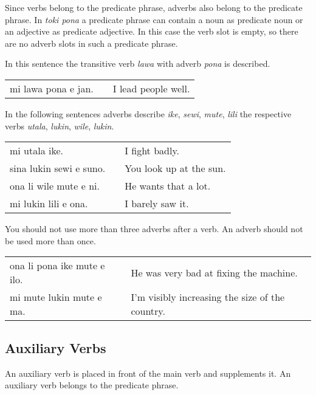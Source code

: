 Since verbs belong to the predicate phrase, adverbs also belong to the predicate phrase.
In \textit{toki pona} a predicate phrase can contain a noun as predicate noun or an adjective as predicate adjective.
In this case the verb slot is empty, so there are no adverb slots in such a predicate phrase.

In this sentence the transitive verb \textit{lawa} with adverb \textit{pona} is described.

\begin{supertabular}{p{5,5cm}|ll}
    mi lawa pona e jan. &  & I lead people well. \\
\end{supertabular}

In the following sentences adverbs describe \textit{ike}, \textit{sewi}, \textit{mute}, \textit{lili} the respective verbs \textit{utala}, \textit{lukin}, \textit{wile}, \textit{lukin}.

\begin{supertabular}{p{5,5cm}|ll}
    mi utala ike.           &  & I fight badly.          \\
    sina lukin sewi e suno. &  & You look up at the sun. \\
    ona li wile mute e ni.  &  & He wants that a lot.    \\
    mi lukin lili e ona.    &  & I barely saw it.        \\
\end{supertabular}

You should not use more than three adverbs after a verb.
An adverb should not be used more than once.

\begin{supertabular}{p{5,5cm}|ll}
    ona li pona ike mute e ilo. &  & He was very bad at fixing the machine.          \\
    mi mute lukin mute e ma.    &  & I'm visibly increasing the size of the country. \\
\end{supertabular}

\subsection*{Auxiliary Verbs}
An auxiliary verb is placed in front of the main verb and supplements it.
An auxiliary verb belongs to the predicate phrase.

